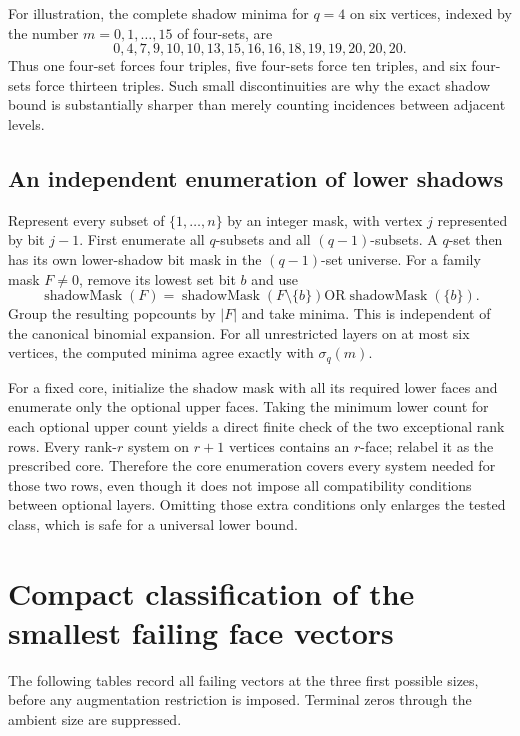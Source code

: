\documentclass[11pt,letterpaper]{article}
\numberwithin{equation}{section}
\theoremstyle{definition}
\theoremstyle{remark}
\begin{document}
For illustration, the complete shadow minima for $q=4$ on six vertices,
indexed by the number $m=0,1,\ldots,15$ of four-sets, are
\[
 0,4,7,9,10,10,13,15,16,16,18,19,19,20,20,20.
\]
Thus one four-set forces four triples, five four-sets force ten triples,
and six four-sets force thirteen triples. Such small discontinuities are
why the exact shadow bound is substantially sharper than merely counting
incidences between adjacent levels.

\subsection{An independent enumeration of lower shadows}
Represent every subset of $\{1,\ldots,n\}$ by an integer mask, with
vertex $j$ represented by bit $j-1$. First enumerate all $q$-subsets and
all $(q-1)$-subsets. A $q$-set then has its own lower-shadow bit mask in
the $(q-1)$-set universe. For a family mask $F\ne0$, remove its lowest set
bit $b$ and use
\[
 \operatorname{shadowMask}(F)
 =\operatorname{shadowMask}(F\setminus\{b\})
       \mathbin{\mathrm{OR}}\operatorname{shadowMask}(\{b\}).
\]
Group the resulting popcounts by $|F|$ and take minima. This is independent
of the canonical binomial expansion. For all unrestricted layers on at
most six vertices, the computed minima agree exactly with $\sigma_q(m)$.

For a fixed core, initialize the shadow mask with all its required lower
faces and enumerate only the optional upper faces. Taking the minimum
lower count for each optional upper count yields a direct finite check of
the two exceptional rank rows. Every rank-$r$ system on $r+1$ vertices
contains an $r$-face; relabel it as the prescribed core. Therefore the
core enumeration covers every system needed for those two rows, even
though it does not impose all compatibility conditions between optional
layers. Omitting those extra conditions only enlarges the tested class,
which is safe for a universal lower bound.

\section{Compact classification of the smallest failing face vectors}
The following tables record all failing vectors at the three first
possible sizes, before any augmentation restriction is imposed. Terminal
zeros through the ambient size are suppressed.
\end{document}
